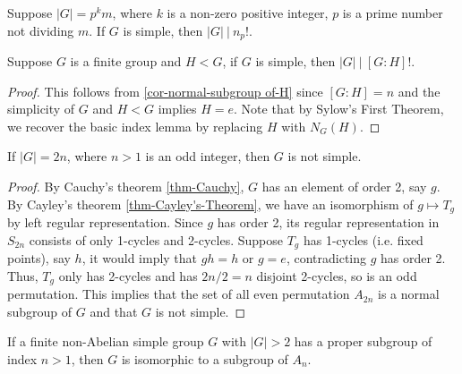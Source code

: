 \begin{lemma} \label{basic-index}
	Suppose $|G| = p^km$, where $k$ is a non-zero positive integer, $p$ is a prime number not dividing $m$. If $G$ is simple, then $|G| ~|~ n_p!.$
\end{lemma}

\begin{theorem} \label{strong-index}
	Suppose $G$ is a finite group and $H < G$, if $G$ is simple, then $|G| ~|~ [G: H]!.$
\end{theorem}

\begin{proof}
	This follows from \ref{cor-normal-subgroup of-H} since $[G:H] = n$ and the simplicity of $G$ and $H < G$ implies $H = e$. Note that by Sylow's First Theorem, we recover the basic index lemma by replacing $H$ with $N_G(H)$.
\end{proof}

\begin{theorem} \label{2-odd}
	If $|G| = 2n$, where $n > 1$ is an odd integer, then $G$ is not simple. 
\end{theorem}

\begin{proof}
	By Cauchy's theorem \ref{thm-Cauchy}, $G$ has an element of order 2, say $g$. By Cayley's theorem \ref{thm-Cayley's-Theorem}, we have an isomorphism of $g \mapsto T_g$ by left regular representation. Since $g$ has order 2, its regular representation in $S_{2n}$ consists of only 1-cycles and 2-cycles. Suppose $T_g$ has 1-cycles (i.e. fixed points), say $h$, it would imply that $gh = h$ or $g = e$, contradicting $g$ has order 2. Thus, $T_g$ only has 2-cycles and has $2n/2 = n$ disjoint 2-cycles, so is an odd permutation. This implies that the set of all even permutation $A_{2n}$ is a normal subgroup of $G$ and that $G$ is not simple.
\end{proof}

\begin{theorem} \label{embedding-thm}
	If a finite non-Abelian simple group $G$ with $|G| > 2$ has a proper subgroup of index $n > 1$, then $G$ is isomorphic to a subgroup of $A_n$.
\end{theorem}


